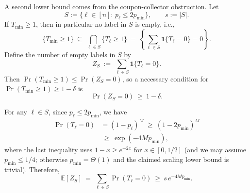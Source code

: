 \documentclass[aps,prx,reprint,superscriptaddress,amsmath,amssymb,longbibliography,floatfix]{revtex4-2}
\newcommand{\dsE}{\mathbb{E}}
\theoremstyle{plain}
\theoremstyle{definition}
\theoremstyle{remark}
\begin{document}
A second lower bound comes from the coupon-collector obstruction. Let
\begin{equation*}
    S:=\{\ell\in[n]:\,p_\ell\le 2p_{\min}\},\qquad s:=|S|.
\end{equation*}
If $T_{\min}\ge 1$, then in particular no label in $S$ is empty, i.e.,
\begin{equation*}
    \{T_{\min}\ge 1\}\ \subseteq\ \bigcap_{\ell\in S}\{T_\ell\ge 1\}
    \ =\ \left\{\sum_{\ell\in S}\mathbf{1}\{T_\ell=0\}=0\right\}.
\end{equation*}
Define the number of empty labels in $S$ by
\begin{equation*}
    Z_S\ :=\ \sum_{\ell\in S}\mathbf{1}\{T_\ell=0\}.
\end{equation*}
Then $\Pr(T_{\min}\ge 1)\le \Pr(Z_S=0)$, so a necessary condition for $\Pr(T_{\min}\ge 1)\ge 1-\delta$
is
\begin{equation}
    \Pr(Z_S=0)\ \ge\ 1-\delta.
    \label{eq:Zs_need}
\end{equation}

For any $\ell\in S$, since $p_\ell\le 2p_{\min}$, we have
\begin{equation}
\begin{aligned}
\Pr(T_\ell=0)&=(1-p_\ell)^M \ \ge\ (1-2p_{\min})^M\\
    &\ \ge\ \exp(-4Mp_{\min}),
    \label{eq:empty_prob_lb_rig}
\end{aligned}
\end{equation}
where the last inequality uses $1-x\ge e^{-2x}$ for $x\in[0,1/2]$ (and we may assume $p_{\min}\le 1/4$;
otherwise $p_{\min}=\Theta(1)$ and the claimed scaling lower bound is trivial).
Therefore,
\begin{equation}
    \dsE[Z_S]
    \ =\ \sum_{\ell\in S}\Pr(T_\ell=0)
    \ \ge\ s\,e^{-4Mp_{\min}}.
    \label{eq:EZs_lb_rig}
\end{equation}
\end{document}
